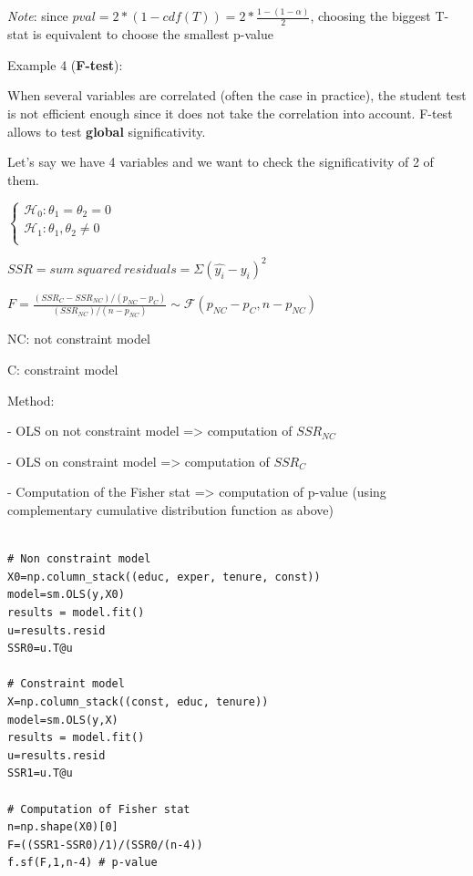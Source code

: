 \textit{Note}: since $pval = 2*(1-cdf(T)) = 2*\frac{1-(1-\alpha)}{2}$, choosing the biggest T-stat is equivalent to choose the smallest p-value

\vspace{5mm}

Example 4 (\textbf{F-test}):

\vspace{5mm}

When several variables are correlated (often the case in practice), the student test is not efficient enough since it does not take the correlation into account. F-test allows to test \textbf{global} significativity.

Let's say we have 4 variables and we want to check the significativity of 2 of them.

\vspace{5mm}

$
\left\{
    \begin{array}{ll}
        \mathcal{H}_0: \theta_1 = \theta_2 = 0\\
        \mathcal{H}_1: \theta_1, \theta_2 \neq 0 \\
    \end{array}
\right.
$

\vspace{5mm}

$SSR = sum~squared~residuals = \Sigma (\widehat{y_i} - y_i)^2$

\vspace{5mm}

$F = \frac{(SSR_C - SSR_{NC})/(p_{NC} - p_C)}{(SSR_{NC})/(n-p_{NC})} \sim \mathcal{F}(p_{NC} - p_C, n-p_{NC})$

\vspace{5mm}

NC: not constraint model

C: constraint model

\vspace{5mm}

Method:

- OLS on not constraint model => computation of $SSR_{NC}$

- OLS  on constraint model => computation of $SSR_{C}$

- Computation of the Fisher stat => computation of p-value (using complementary cumulative distribution function as above)

\lstset{language=Python}
\lstset{frame=lines}
\lstset{basicstyle=\footnotesize}
\begin{lstlisting}

# Non constraint model
X0=np.column_stack((educ, exper, tenure, const))
model=sm.OLS(y,X0)
results = model.fit()
u=results.resid
SSR0=u.T@u

# Constraint model
X=np.column_stack((const, educ, tenure))
model=sm.OLS(y,X)
results = model.fit()
u=results.resid
SSR1=u.T@u

# Computation of Fisher stat
n=np.shape(X0)[0]
F=((SSR1-SSR0)/1)/(SSR0/(n-4))
f.sf(F,1,n-4) # p-value

\end{lstlisting}


\vspace{5mm}